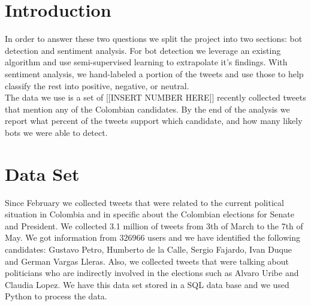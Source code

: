 \documentclass[10pt,a4paper]{article} %
\begin{document}
	\pagestyle{plain}
	\title{\rmfamily\normalfont{}}
	\author{ \\ }
	\date{} %
	
	\maketitle
	
	\begin{abstract}
		\noindent Between May and June of 2018 the people of Colombia will vote for their next president.  As with any modern election, people are using Twitter, the social media platform, to support candidates they like, discredit the others, and debate who should win.  Twitter provides a massive open forum to create dialogue across the country.  Some groups take advantage of this by creating \textit{social bots}, which automatically post political tweets to in an attempt to sway votors \cite{swaine_2018}.  In our project, we use the text mining skills gained in this course to assess the influence of these bots.  We hope to answer two questions: how many bots are there and who are they supporting?
		
	\end{abstract}
	
	\section{Introduction}
		In order to answer these two questions we split the project into two sections:  bot detection and sentiment analysis.  For bot detection we leverage an existing algorithm and use semi-supervised learning to extrapolate it's findings.  With sentiment analysis, we hand-labeled a portion of the tweets and use those to help classify the rest into positive, negative, or neutral. \\
		
		\noindent The data we use is a set of [[INSERT NUMBER HERE]] recently collected tweets that mention any of the Colombian candidates.  By the end of the analysis we report what percent of the tweets support which candidate, and how many likely bots we were able to detect.
	\section{Data Set}
	Since February we collected tweets that were related to the current political situation in Colombia and in specific about the Colombian elections for Senate and President. We collected 3.1 million of tweets from 3th of March to the 7th of May. We got information from 326966 users and we have identified the following candidates: Gustavo Petro, Humberto de la Calle, Sergio Fajardo, Ivan Duque and German Vargas Lleras. Also, we collected tweets that were talking about politicians who are indirectly involved in the elections such as Alvaro Uribe and Claudia Lopez. We have this data set stored in a SQL data base and we used Python to process the data.
\end{document}
